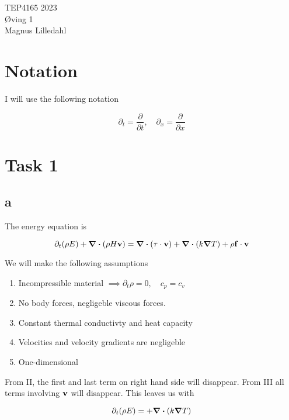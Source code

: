 \documentclass{article}
\begin{document}
\begin{center}
{\Large
TEP4165 2023 \\
Øving 1 \\
\normalsize
Magnus Lilledahl
}
\end{center}

\section*{Notation}

I will use the following notation

\begin{equation}
	\partial_t = \frac{\partial}{\partial t}, \quad \partial_x = \frac{\partial}{\partial x}
\end{equation}

\section*{Task 1}

\subsection*{a}
The energy equation is

\begin{equation}
	\partial_t (\rho E) + \div{(\rho H \mathbf{v})} = \div{(\tau \cdot \mathbf{v})} + \div{(k\grad{T}})+ \rho \mathbf{f} \cdot \mathbf{v}
\end{equation}

We will make the following assumptions

\begin{enumerate}[I]
	\item Incompressible material $\implies \partial_t \rho = 0, \quad c_p = c_v$
	\item No body forces, negligeble viscous forces.
	\item Constant thermal conductivty and heat capacity
	\item Velocities and velocity gradients are negligeble
	\item One-dimensional
\end{enumerate}

From II, the first and last term on right hand side will disappear. From III all terms involving $\mathbf{v}$ will disappear. This leaves us with

\begin{equation}
	\partial_t (\rho E) = + \div{(k\grad{T} )}
\end{equation}
\end{document}
